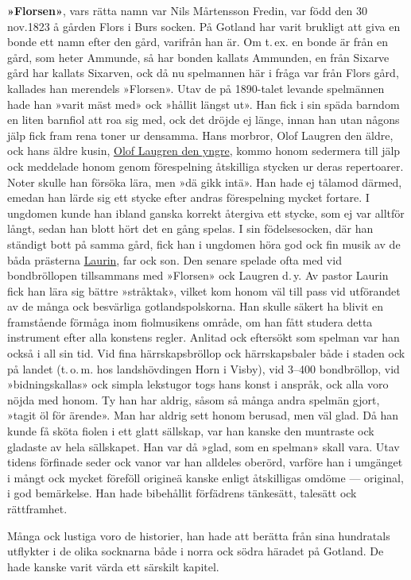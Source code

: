 \textbf{»Florsen»}, vars rätta namn var Nils Mårtensson Fredin, var född den 30 nov.\@ 1823 å gården Flors i Burs socken. På Gotland har varit brukligt att giva en bonde ett namn efter den gård, varifrån han är. Om t.\,ex. en bonde är från en gård, som heter Ammunde, så har bonden kallats Ammunden, en från Sixarve gård har kallats Sixarven, ock då nu spelmannen här i fråga var från Flors gård, kallades han merendels »Florsen». Utav de på 1890-talet levande spelmännen hade han »varit mäst med» ock »hållit längst ut». Han fick i sin späda barndom en liten barnfiol att roa sig med, ock det dröjde ej länge, innan han utan någons jälp fick fram rena toner ur densamma. Hans morbror, Olof Laugren den äldre, ock hans äldre kusin, \href{Laugren}{Olof Laugren den yngre}, kommo honom sedermera till jälp ock meddelade honom genom förespelning åtskilliga stycken ur deras repertoarer. Noter skulle han försöka lära, men »dä gikk intä». Han hade ej tålamod därmed, emedan han lärde sig ett stycke efter andras förespelning mycket fortare. I ungdomen kunde han ibland ganska korrekt återgiva ett stycke, som ej var alltför långt, sedan han blott hört det en gång spelas. I sin födelsesocken, där han ständigt bott på samma gård, fick han i ungdomen höra god ock fin musik av de båda prästerna \href{Laurin}{Laurin}, far ock son. Den senare spelade ofta med vid bondbröllopen tillsammans med »Florsen» ock Laugren d.\,y\@. Av pastor Laurin fick han lära sig bättre »stråktak», vilket kom honom väl till pass vid utförandet av de många ock besvärliga gotlandspolskorna. Han skulle säkert ha blivit en framstående förmåga inom fiolmusikens område, om han fått studera detta instrument efter alla konstens regler. Anlitad ock eftersökt som spelman var han också i all sin tid. Vid fina härrskapsbröllop ock härrskapsbaler både i staden ock på landet (t.\,o.\,m. hos landshövdingen Horn i Visby), vid 3--400 bondbröllop, vid »bidningskallas» ock simpla lekstugor togs hans konst i anspråk, ock alla voro nöjda med honom. Ty han har aldrig, såsom så många andra spelmän gjort, »tagit öl för ärende». Man har aldrig sett honom berusad, men väl glad. Då han kunde få sköta fiolen i ett glatt sällskap, var han kanske den muntraste ock gladaste av hela sällskapet. Han var då »glad, som en spelman» skall vara. Utav tidens förfinade seder ock vanor var han alldeles oberörd, varföre han i umgänget i mångt ock mycket föreföll origineä kanske enligt åtskilligas omdöme --- original, i god bemärkelse. Han hade bibehållit förfädrens tänkesätt, talesätt ock rättframhet. 

Många ock lustiga voro de historier, han hade att berätta från sina hundratals utflykter i de olika socknarna både i norra ock södra häradet på Gotland. De hade kanske varit värda ett särskilt kapitel. 

